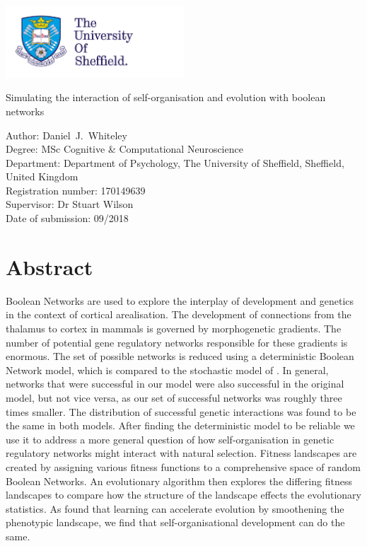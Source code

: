 \documentclass[a4paper,11pt]{article}
\date{}
\begin{document}
\includegraphics[width=0.5\textwidth,clip=true,trim=0cm 0cm 0cm 0cm]{TUOSlogo.png}
\vspace{10em}
\begin{center}
{\huge
Simulating the interaction of self-organisation and evolution with boolean networks\vspace{6em}
}
\end{center}
\begin{flushleft}
Author: Daniel~J.~Whiteley \vspace{1em}\\
Degree: MSc Cognitive \& Computational Neuroscience \vspace{1em}\\
Department: Department of Psychology, The University of Sheffield, Sheffield, United Kingdom\vspace{1em}\\
Registration number: 170149639\vspace{1em}\\
Supervisor: Dr Stuart Wilson \vspace{1em}\\
Date of submission: 09/2018\vspace{5em}\\
\end{flushleft}
\newpage{}

\section*{Abstract}
 
Boolean Networks are used to explore the interplay of development and genetics in the context of cortical arealisation. The development of connections from the thalamus to cortex in mammals is governed by morphogenetic gradients. The number of potential gene regulatory networks responsible for these gradients is enormous. The set of possible networks is reduced using a deterministic Boolean Network model, which is compared to the stochastic model of \cite{Giacomantonio2010}. In general, networks that were successful in our model were also successful in the original model, but not vice versa, as our set of successful networks was roughly three times smaller. The distribution of successful genetic interactions was found to be the same in both models.  After finding the deterministic model to be reliable we use it to address a more general question of how self-organisation in genetic regulatory networks might interact with natural selection. Fitness landscapes are created by assigning various fitness functions to a comprehensive space of random Boolean Networks. An evolutionary algorithm then explores the differing fitness landscapes to compare how the structure of the landscape effects the evolutionary statistics. As \cite{Hinton1987} found that learning can accelerate evolution by smoothening the phenotypic landscape, we find that self-organisational development can do the same. 
 
\end{document}
